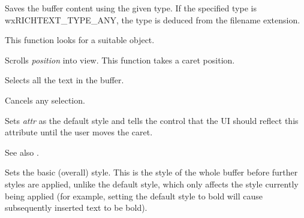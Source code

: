 
Saves the buffer content using the given type. If the specified type
is wxRICHTEXT\_TYPE\_ANY, the type is deduced from the filename extension.

This function looks for a suitable  object.

\label{wxrichtextctrlscrollintoview}


Scrolls {\it position} into view. This function takes a caret position.

\label{wxrichtextctrlselectall}


Selects all the text in the buffer.

\label{wxrichtextctrlselectnone}


Cancels any selection.

\label{wxrichtextctrlsetandshowdefaultstyle}


Sets {\it attr} as the default style and tells the control that the UI should reflect
this attribute until the user moves the caret.

See also .

\label{wxrichtextctrlsetbasicstyle}



Sets the basic (overall) style. This is the style of the whole
buffer before further styles are applied, unlike the default style, which
only affects the style currently being applied (for example, setting the default
style to bold will cause subsequently inserted text to be bold).

\label{wxrichtextctrlsetcaretposition}

